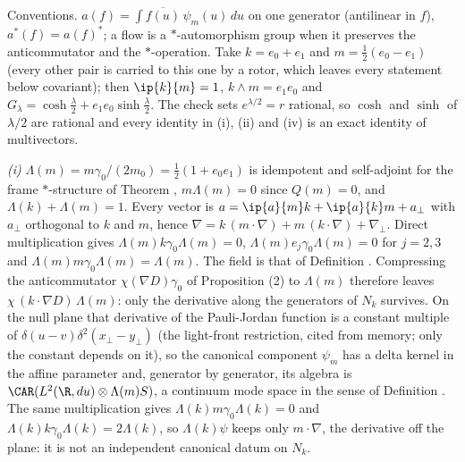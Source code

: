 Conventions. $a(f) = \int \overline{f(u)}\,\psi_{m}(u)\,du$ on one generator (antilinear in $f$), $a^{*}(f) = a(f)^{*}$; a flow is a $*$-automorphism group when it preserves the anticommutator and the $*$-operation. Take $k = e_{0} + e_{1}$ and $m = \tfrac12(e_{0} - e_{1})$ (every other pair is carried to this one by a rotor, which leaves every statement below covariant); then $\ip{k}{m} = 1$, $k \wedge m = e_{1}e_{0}$ and $G_{\lambda} = \cosh\tfrac{\lambda}{2} + e_{1}e_{0}\sinh\tfrac{\lambda}{2}$. The check sets $e^{\lambda/2} = r$ rational, so $\cosh$ and $\sinh$ of $\lambda/2$ are rational and every identity in (i), (ii) and (iv) is an exact identity of multivectors.

\emph{(i)} $\Lambda(m) = m\gamma_{0}/(2m_{0}) = \tfrac12(1 + e_{0}e_{1})$ is idempotent and self-adjoint for the frame $*$-structure of Theorem , $m\Lambda(m) = 0$ since $Q(m) = 0$, and $\Lambda(k) + \Lambda(m) = 1$. Every vector is $a = \ip{a}{m}k + \ip{a}{k}m + a_{\perp}$ with $a_{\perp}$ orthogonal to $k$ and $m$, hence $\nabla = k\,(m\cdot\nabla) + m\,(k\cdot\nabla) + \nabla_{\perp}$. Direct multiplication gives $\Lambda(m)k\gamma_{0}\Lambda(m) = 0$, $\Lambda(m)e_{j}\gamma_{0}\Lambda(m) = 0$ for $j = 2, 3$ and $\Lambda(m)m\gamma_{0}\Lambda(m) = \Lambda(m)$. The field is that of Definition . Compressing the anticommutator $\chi(\nabla D)\gamma_{0}$ of Proposition (2) to $\Lambda(m)$ therefore leaves $\chi\,(k\cdot\nabla D)\,\Lambda(m)$: only the derivative along the generators of $N_{k}$ survives. On the null plane that derivative of the Pauli-Jordan function is a constant multiple of $\delta(u - v)\delta^{2}(x_{\perp} - y_{\perp})$ (the light-front restriction, cited from memory; only the constant depends on it), so the canonical component $\psi_{m}$ has a delta kernel in the affine parameter and, generator by generator, its algebra is $\CAR(L^{2}(\R, du)\otimes\Lambda(m)S)$, a continuum mode space in the sense of Definition . The same multiplication gives $\Lambda(k)m\gamma_{0}\Lambda(k) = 0$ and $\Lambda(k)k\gamma_{0}\Lambda(k) = 2\Lambda(k)$, so $\Lambda(k)\psi$ keeps only $m\cdot\nabla$, the derivative off the plane: it is not an independent canonical datum on $N_{k}$.

